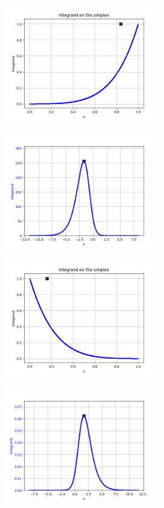 \begin{figure}[!htb]
\begin{center}
\begin{subfigure}%
    \centering
    \includegraphics[height=2in]{Chap6_EvaluationAndAnalysis/images/Simplex_model_D_1_1_4_4_N_3_3.png}
\end{subfigure}
\begin{subfigure}%
    \centering
    \includegraphics[height=2in]{Chap6_EvaluationAndAnalysis/images/Real_model_D_1_1_4_4_N_3_3.png}
\end{subfigure}
\begin{subfigure}%
    \centering
    \includegraphics[height=2in]{Chap6_EvaluationAndAnalysis/images/Simplex_model_D_1_1_025_025_N_3_3.png}
\end{subfigure}
\begin{subfigure}%
    \centering
    \includegraphics[height=2in]{Chap6_EvaluationAndAnalysis/images/Real_model_D_1_1_025_025_N_3_3.png}

\end{subfigure}
\end{center}
\end{figure}
